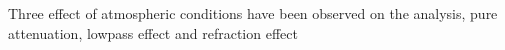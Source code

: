 
Three effect of atmospheric conditions have been observed on the analysis, pure attenuation, lowpass effect and refraction effect
